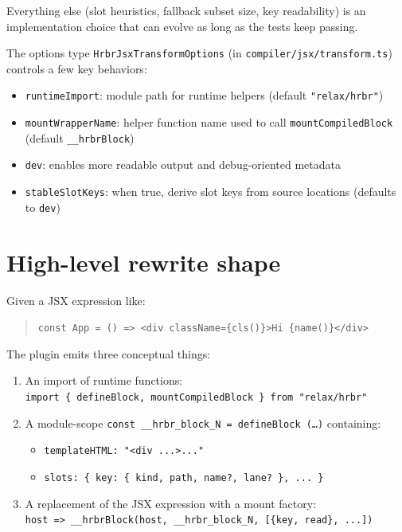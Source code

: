 Everything else (slot heuristics, fallback subset size, key readability) is an implementation choice that can evolve as long as the tests keep passing.

The options type \texttt{HrbrJsxTransformOptions} (in \texttt{compiler/jsx/transform.ts}) controls a few key behaviors:

\begin{itemize}
\item \texttt{runtimeImport}: module path for runtime helpers (default \texttt{"relax/hrbr"})
\item \texttt{mountWrapperName}: helper function name used to call \texttt{mountCompiledBlock} (default \texttt{\_\_hrbrBlock})
\item \texttt{dev}: enables more readable output and debug-oriented metadata
\item \texttt{stableSlotKeys}: when true, derive slot keys from source locations (defaults to \texttt{dev})
\end{itemize}

\section{High-level rewrite shape}

Given a JSX expression like:

\begin{quote}
\texttt{const App = () => <div className=\{cls()\}>Hi \{name()\}</div>}
\end{quote}

The plugin emits three conceptual things:

\begin{enumerate}
\item An import of runtime functions:\\
\texttt{import \{ defineBlock, mountCompiledBlock \} from "relax/hrbr"}
\item A module-scope \texttt{const \_\_hrbr\_block\_N = defineBlock (\ldots)} containing:
  \begin{itemize}
  \item \texttt{templateHTML: "<div ...>..."}
  \item \texttt{slots: \{ key: \{ kind, path, name?, lane? \}, ... \}}
  \end{itemize}
\item A replacement of the JSX expression with a mount factory:\\
\texttt{host => \_\_hrbrBlock(host, \_\_hrbr\_block\_N, [\{key, read\}, ...])}
\end{enumerate}

